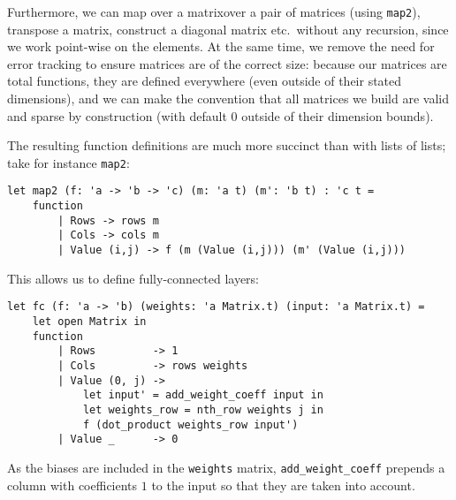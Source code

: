 \documentclass[runningheads]{llncs}
\newcommand{\knote}[1]{\todo[inline, color=blue!20]{#1}}
\begin{document}
Furthermore, we can map over a matrixover a pair of matrices  (using \lstinline{map2}), transpose a
matrix, construct a diagonal matrix etc.\ without any recursion, since we work
point-wise on the elements. At the same time, we remove the need for error
tracking to ensure matrices are of the correct size: because our matrices are
total functions, they are defined everywhere (even outside of their stated
dimensions), and we can make the convention that all matrices we build are valid
and sparse by construction (with default 0 outside of their dimension bounds).

The resulting function definitions are much more succinct than with lists of lists; take for instance \lstinline{map2}:

\begin{lstlisting}[language=caml]
let map2 (f: 'a -> 'b -> 'c) (m: 'a t) (m': 'b t) : 'c t =
	function
		| Rows -> rows m
		| Cols -> cols m
		| Value (i,j) -> f (m (Value (i,j))) (m' (Value (i,j)))
\end{lstlisting}

\noindent This allows us to define fully-connected layers:

\begin{lstlisting}[language=caml]
let fc (f: 'a -> 'b) (weights: 'a Matrix.t) (input: 'a Matrix.t) = 
	let open Matrix in
	function
		| Rows         -> 1
		| Cols         -> rows weights
		| Value (0, j) -> 
			let input' = add_weight_coeff input in
			let weights_row = nth_row weights j in
			f (dot_product weights_row input')
		| Value _      -> 0
\end{lstlisting}

\noindent As the biases are included in the \lstinline|weights| matrix, \lstinline|add_weight_coeff| prepends a column with coefficients $1$ to the input so that they are taken into account.

\iffalse
-----------------------

\noindent The only help Imandra needs to prove this automatically -- are the forward-chaining rules about the $relu$ function:


\begin{lstlisting}[language=caml]
	lemma relu_pos x =
	x >= 0 ==> (relu x) [@trigger] = x
	[@@auto] [@@fc]
	
	lemma relu_neg x =
	x <= 0 ==> (relu x) [@trigger] = 0
	[@@auto] [@@fc]
\end{lstlisting}

\noindent And then we disable $relu$ for all of the proofs. This way,
$relu$ induces no simplification case-splits, while all
relevant information about $relu$ values is propagated,
per instance, on demand to our simplification context.
Now Imandra's engine takes care of the proof automatically  (when we use the tactic \lstinline{[@@auto]}), and takes just under 1.5 minutes.
\knote{explain better how auto works}
----------------------
\fi
\end{document}

